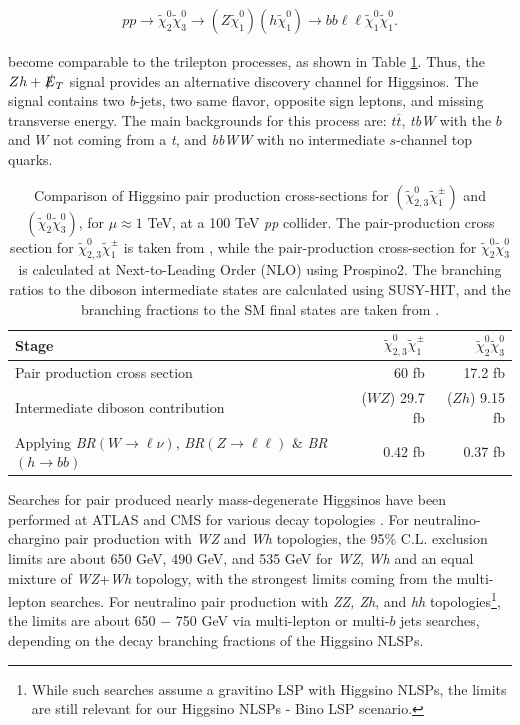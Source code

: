 \documentclass[a4paper,11pt]{article}
\newcommand{\N}{\widetilde{\chi}^0}
\newcommand{\C}{\widetilde{\chi}^\pm}
\newcommand{\met}{{\slashed{E}_T}}
\begin{document}
\begin{align}
  pp\rightarrow \N_2\N_3\rightarrow (Z\N_1)(h\N_1)\rightarrow bb\ell\ell \N_1\N_1.
\end{align} 

\noindent become comparable to the trilepton processes, as shown in Table
\ref{tab:xsections}. Thus, the $Zh+\met$ signal provides an alternative discovery
channel for Higgsinos. The signal contains two \emph{b}-jets, two same flavor,
opposite sign leptons, and missing transverse energy. The main backgrounds for
this process are: $t\overline{t}$, \emph{tbW} with the $b$ and $W$ not coming
from a \emph{t}, and \emph{bbWW} with no intermediate $s$-channel top quarks.  




\begin{table}
  \centering
  \begin{tabular}{l|rr}
    \toprule
    Stage & $\N_{2,3}\C_1$ & $\N_2\N_3$\\
    \midrule
    Pair production cross section & 60 fb & 17.2 fb\\
    Intermediate diboson contribution & ($WZ$) 29.7 fb  & ($Zh$) 9.15 fb \\
    Applying \emph{BR}$(W\rightarrow \ell\nu)$, \emph{BR}$(Z\rightarrow \ell\ell)$ \& \emph{BR}$(h\rightarrow bb)$ & 0.42 fb & 0.37 fb\\
    \bottomrule
  \end{tabular}
  \caption{Comparison of Higgsino pair production cross-sections for
    $(\N_{2,3}\C_1)$ and
    $(\N_{2}\N_{3})$, for $\mu\approx 1$ TeV, at a 100
    TeV \emph{pp} collider. 
    The pair-production cross section for $\N_{2,3}\C_1$ is taken from
    \cite{Gori:2014oua}, while the pair-production cross-section for $\N_2\N_3$
    is calculated at Next-to-Leading Order (NLO) using Prospino2. The branching
    ratios to the diboson intermediate states are calculated using SUSY-HIT,
    and the branching fractions to the SM final states are taken from
    \cite{Olive:2016xmw}.}
  \label{tab:xsections}
\end{table}



Searches for pair produced nearly mass-degenerate Higgsinos  have been
performed at ATLAS and CMS for various decay topologies
\cite{Aaboud:2018htj,Sirunyan:2018ubx,Aaboud:2018zeb}.  
For neutralino-chargino pair production with \emph{WZ} and \emph{Wh} topologies, the 95\%
C.L. exclusion limits are about 650 GeV, 490 GeV, and 535 GeV for \emph{WZ}, \emph{Wh} and an equal mixture of \emph{WZ}+\emph{Wh} topology, with the strongest limits coming from
the multi-lepton searches.  For neutralino pair production with \emph{ZZ, Zh}, and \emph{hh} topologies\footnote{While such searches assume a gravitino LSP with Higgsino NLSPs, the limits are still relevant for our Higgsino NLSPs - Bino
LSP scenario.}, the limits are about 650 $-$ 750 GeV via multi-lepton or
multi-$b$ jets searches, depending on the decay branching fractions of the Higgsino NLSPs. 
\end{document}
